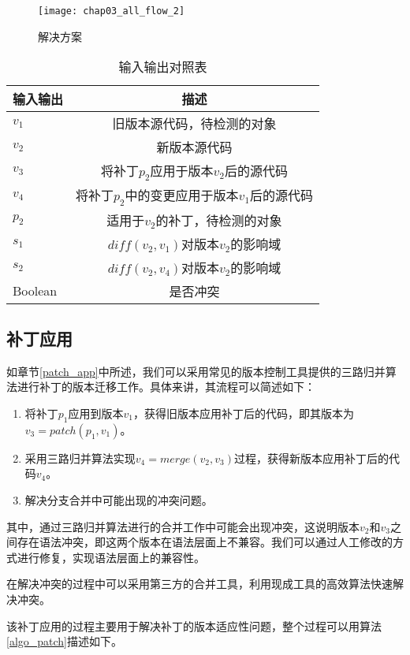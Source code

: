 \begin{figure}[H]
	\centering
	\texttt{[image: chap03\_all\_flow\_2]}
	\caption {解决方案}
	\label {all_flow}	
\end{figure}

\begin{table}[H]
	\caption{输入输出对照表}
	\label{all_io}
	\centering
	\begin{tabular}{lc}
		\toprule[1.5pt]
		{\heiti 输入输出} & {\heiti 描述}\\\midrule[1pt]
		$v_1$ & 旧版本源代码，待检测的对象 \\
		$v_2$ & 新版本源代码 \\
		$v_3$ & 将补丁$p_2$应用于版本$v_2$后的源代码 \\
		$v_4$ & 将补丁$p_2$中的变更应用于版本$v_1$后的源代码 \\
		$p_2$ & 适用于$v_2$的补丁，待检测的对象 \\
		$s_1$ & $diff(v_2,v_1)$对版本$v_2$的影响域 \\
		$s_2$ & $diff(v_2,v_4)$对版本$v_2$的影响域 \\
		Boolean & 是否冲突 \\
		\bottomrule[1.5pt]
	\end{tabular}
\end{table}

\subsection{补丁应用}

如章节\ref {patch_app}中所述，我们可以采用常见的版本控制工具提供的三路归并算法进行补丁的版本迁移工作。具体来讲，其流程可以简述如下：
\begin{enumerate}
	\item 将补丁$p_1$应用到版本$v_1$，获得旧版本应用补丁后的代码，即其版本为$v_3 = patch(p_1,v_1)$。
	\item 采用三路归并算法实现$v_4 = merge(v_2,v_3)$过程，获得新版本应用补丁后的代码$v_4$。
	\item 解决分支合并中可能出现的冲突问题。
\end{enumerate}

其中，通过三路归并算法进行的合并工作中可能会出现冲突，这说明版本$v_2$和$v_3$之间存在语法冲突，即这两个版本在语法层面上不兼容。我们可以通过人工修改的方式进行修复，实现语法层面上的兼容性。

在解决冲突的过程中可以采用第三方的合并工具，利用现成工具的高效算法快速解决冲突。

该补丁应用的过程主要用于解决补丁的版本适应性问题，整个过程可以用算法\ref {algo_patch}描述如下。

